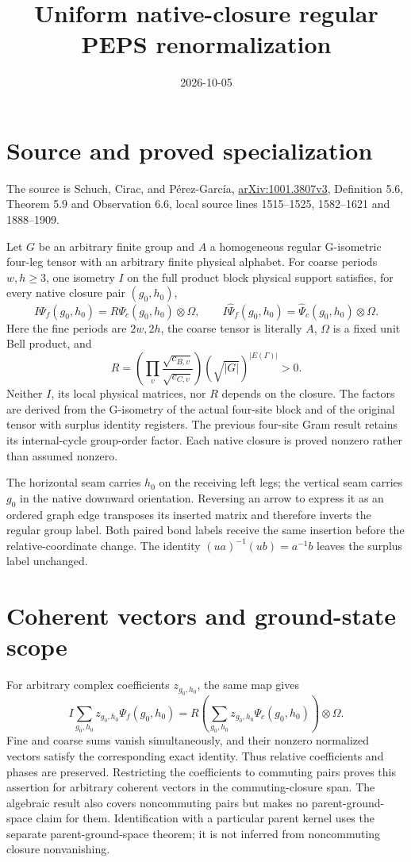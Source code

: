 \documentclass{article}
\title{Uniform native-closure regular PEPS renormalization}
\author{}
\date{2026-10-05}
\begin{document}
\maketitle
{}

\section{Source and proved specialization}
The source is Schuch, Cirac, and P\'erez-Garc\'ia,
\href{https://arxiv.org/abs/1001.3807v3}{arXiv:1001.3807v3},
Definition 5.6, Theorem 5.9 and Observation 6.6, local source lines
1515--1525, 1582--1621 and 1888--1909.

Let $G$ be an arbitrary finite group and $A$ a homogeneous regular
G-isometric four-leg tensor with an arbitrary finite physical alphabet.
For coarse periods $w,h\geq3$, one isometry $I$ on the full product block
physical support satisfies, for every native closure pair $(g_0,h_0)$,
\[
 I\Psi_f(g_0,h_0)=R\Psi_c(g_0,h_0)\otimes\Omega,\qquad
 I\widehat\Psi_f(g_0,h_0)=\widehat\Psi_c(g_0,h_0)\otimes\Omega.
\]
Here the fine periods are $2w,2h$, the coarse tensor is literally $A$,
$\Omega$ is a fixed unit Bell product, and
\[
 R=\left(\prod_v\frac{\sqrt{c_{B,v}}}{\sqrt{c_{C,v}}}\right)
    (\sqrt{|G|})^{|E(\Gamma)|}>0.
\]
Neither $I$, its local physical matrices, nor $R$ depends on the closure.
The factors are derived from the G-isometry of the actual four-site block
and of the original tensor with surplus identity registers. The previous
four-site Gram result retains its internal-cycle group-order factor.
Each native closure is proved nonzero rather than assumed nonzero.

The horizontal seam carries $h_0$ on the receiving left legs; the
vertical seam carries $g_0$ in the native downward orientation. Reversing
an arrow to express it as an ordered graph edge transposes its inserted
matrix and therefore inverts the regular group label. Both paired bond
labels receive the same insertion before the relative-coordinate change.
The identity $(ua)^{-1}(ub)=a^{-1}b$ leaves the surplus label unchanged.

\section{Coherent vectors and ground-state scope}
For arbitrary complex coefficients $z_{g_0,h_0}$, the same map gives
\[
 I\sum_{g_0,h_0}z_{g_0,h_0}\Psi_f(g_0,h_0)
 =R\left(\sum_{g_0,h_0}z_{g_0,h_0}\Psi_c(g_0,h_0)\right)\otimes\Omega.
\]
Fine and coarse sums vanish simultaneously, and their nonzero normalized
vectors satisfy the corresponding exact identity. Thus relative
coefficients and phases are preserved. Restricting the coefficients to
commuting pairs proves this assertion for arbitrary coherent vectors in
the commuting-closure span. The algebraic result also covers noncommuting
pairs but makes no parent-ground-space claim for them. Identification with
a particular parent kernel uses the separate parent-ground-space theorem;
it is not inferred from noncommuting closure nonvanishing.
\end{document}

